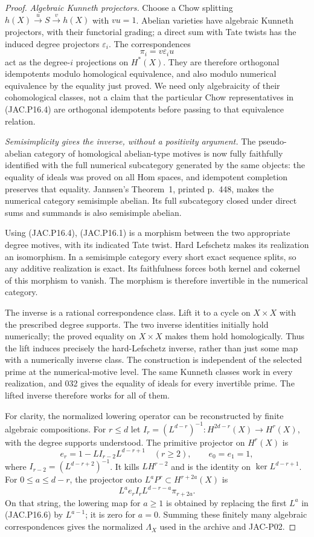 \begin{proof}
\emph{Algebraic Kunneth projectors.}
Choose a Chow splitting $h(X)\xrightarrow{u}S\xrightarrow{v}h(X)$
with $vu=1$. Abelian varieties have algebraic Kunneth projectors,
with their functorial grading; a direct sum with Tate twists has
the induced degree projectors $\varepsilon_i$. The correspondences
\[
                         \pi_i=v\varepsilon_i u          \tag{JAC.P16.4}
\]
act as the degree-$i$ projections on $H^*(X)$. They are therefore
orthogonal idempotents modulo homological equivalence, and also
modulo numerical equivalence by the equality just proved. We
need only algebraicity of their cohomological classes, not a claim
that the particular Chow representatives in (JAC.P16.4) are
orthogonal idempotents before passing to that equivalence relation.

\emph{Semisimplicity gives the inverse, without a positivity argument.}
The pseudo-abelian category of homological abelian-type motives
is now fully faithfully identified with the full numerical
subcategory generated by the same objects: the equality of ideals
was proved on all Hom spaces, and idempotent completion preserves
that equality. Jannsen's Theorem~1, printed p.~448, makes the
numerical category semisimple abelian. Its full subcategory closed
under direct sums and summands is also semisimple abelian.

Using (JAC.P16.4), (JAC.P16.1) is a morphism between the two
appropriate degree motives, with its indicated Tate twist.
Hard Lefschetz makes its realization an isomorphism. In a
semisimple category every short exact sequence splits, so any
additive realization is exact. Its faithfulness forces both kernel
and cokernel of this morphism to vanish. The morphism is therefore
invertible in the numerical category.

The inverse is a rational correspondence class. Lift it to a
cycle on $X\times X$ with the prescribed degree supports. The
two inverse identities initially hold numerically; the proved
equality on $X\times X$ makes them hold homologically. Thus the
lift induces precisely the hard-Lefschetz inverse, rather than
just some map with a numerically inverse class.
The construction is independent of the selected prime at the
numerical-motive level. The same Kunneth classes work in every
realization, and 032 gives the equality of ideals for every
invertible prime. The lifted inverse therefore works for all of
them.

For clarity, the normalized lowering operator can be reconstructed
by finite algebraic compositions. For $r\le d$ let
$I_r=(L^{d-r})^{-1}:H^{2d-r}(X)\to H^r(X)$, with the degree
supports understood. The primitive projector on $H^r(X)$ is
\[
 e_r=1-L I_{r-2}L^{d-r+1}\quad(r\ge2),
 \qquad e_0=e_1=1,                                     \tag{JAC.P16.5}
\]
where $I_{r-2}=(L^{d-r+2})^{-1}$.
It kills $LH^{r-2}$ and is the identity on
$\ker L^{d-r+1}$. For $0\le a\le d-r$, the projector onto
$L^aP^r\subset H^{r+2a}(X)$ is
\[
             L^a e_r I_r L^{d-r-a}\pi_{r+2a}.           \tag{JAC.P16.6}
\]
On that string, the lowering map for $a\ge1$ is obtained by
replacing the first $L^a$ in (JAC.P16.6) by $L^{a-1}$; it is
zero for $a=0$. Summing these finitely many algebraic
correspondences gives the normalized $\Lambda_X$ used in the
archive and JAC-P02.


\end{proof}
